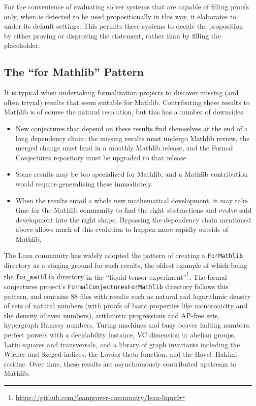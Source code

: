 For the convenience of evaluating solver systems that are capable of filling proofs only,
when  is detected to be used propositionally in this way, it elaborates to  under its default settings.
This permits these systems to decide the proposition by either proving or disproving the statement, rather than by filling the placeholder.


\subsection{The \enquote{for Mathlib} Pattern}\label{sec:app_for_mathlib}

It is typical when undertaking formalization projects to discover missing (and often trivial) results that seem suitable for Mathlib.
Contributing these results to Mathlib is of course the natural resolution, but this has a number of downsides:
\begin{itemize}
\item  New conjectures that depend on these results find themselves at the end of a long dependency chain; the missing results must undergo Mathlib review, the merged change must land in a monthly Mathlib release, and the Formal Conjectures repository must be upgraded to that release
\item Some results may be too specialized for Mathlib, and a Mathlib contribution would require generalizing these immediately.
\item When the results entail a whole new mathematical development, it may take time for the Mathlib community to find the right abstractions and evolve said development into the right shape. Bypassing the dependency chain mentioned above allows much of this evolution to happen more rapidly outside of Mathlib.
\end{itemize}

The Lean community has widely adopted the pattern of creating a \texttt{ForMathlib} directory as a staging ground for such results, the oldest example of which being \href{https://github.com/leanprover-community/lean-liquid/tree/master/src/for\_Mathlib}{the \texttt{for\_mathlib} directory} in the \enquote{liquid tensor experiment}\footnote{\url{https://github.com/leanprover-community/lean-liquid}}.
The formal-conjectures project's \texttt{FormalConjecturesForMathlib} directory follows this pattern, and contains 88 files with results such as natural and logarithmic density of sets of natural numbers (with proofs of basic properties like monotonicity and the density of even numbers), arithmetic progressions and AP-free sets, hypergraph Ramsey numbers, Turing machines and busy beaver halting numbers, perfect powers with a decidability instance, VC dimension in abelian groups, Latin squares and transversals, and a library of graph invariants including the Wiener and Szeged indices, the Lov\'{a}sz theta function, and the Havel--Hakimi residue.
Over time, these results are asynchronously contributed upstream to Mathlib.

